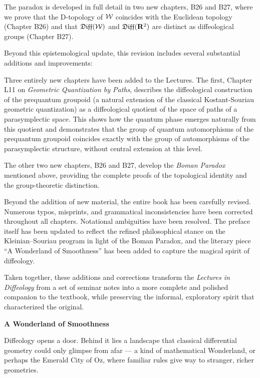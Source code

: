 The paradox is developed in full detail in two new chapters,
B26 and B27,
where we prove that the D-topology of $\mathcal{W}$ coincides with the Euclidean topology (Chapter B26)
and that $\mathfrak{Diff}(\mathcal{W})$ and $\mathfrak{Diff}(\mathbf{R}^2)$ are distinct as diffeological groups (Chapter B27).

Beyond this epistemological update,
this revision includes several substantial additions and improvements:

Three entirely new chapters have been added to the Lectures.
The first,
Chapter L11 on \emph{Geometric Quantization by Paths},
describes the diffeological construction of the prequantum groupoid
(a natural extension of the classical Kostant-Souriau geometric quantization)
as a diffeological quotient of the space of paths of a parasymplectic space.
This shows how the quantum phase emerges naturally from this quotient
and demonstrates that the group of quantum automorphisms of the prequantum groupoid coincides exactly with the group of automorphisms of the parasymplectic structure,
without central extension at this level.

The other two new chapters,
B26 and B27,
develop the \emph{Boman Paradox} mentioned above,
providing the complete proofs of the topological identity and the group-theoretic distinction.

Beyond the addition of new material,
the entire book has been carefully revised.
Numerous typos,
misprints,
and grammatical inconsistencies have been corrected throughout all chapters.
Notational ambiguities have been resolved.
The preface itself has been updated to reflect the refined philosophical stance on the Kleinian--Souriau program
in light of the Boman Paradox,
and the literary piece ``A Wonderland of Smoothness'' has been added to capture the magical spirit of diffeology.

Taken together,
these additions and corrections transform the \emph{Lectures in Diffeology} from a set of seminar notes into a more complete and polished companion to the textbook,
while preserving the informal,
exploratory spirit that characterized the original.

\medskip
\centerline{\Large \bf A Wonderland of Smoothness}
\smallskip

Diffeology opens a door.
Behind it lies a landscape that classical differential geometry could only glimpse from afar — a kind of mathematical Wonderland,
or perhaps the Emerald City of Oz,
where familiar rules give way to stranger,
richer geometries.

